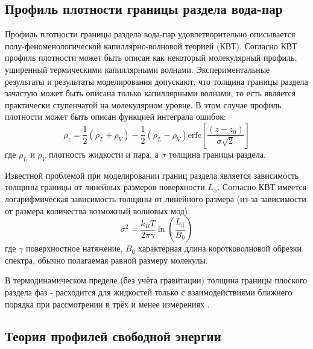 \subsection{Профиль плотности границы раздела вода-пар}

Профиль плотности границы раздела вода-пар удовлетворительно описывается полу-феноменологической капиллярно-волновой теорией (КВТ). Согласно КВТ \cite{cwt_stillinger_1965,rev_benjamin_liq-liq_interf_1997} профиль плотности может быть описан как некоторый молекулярный профиль, уширенный термическими капиллярными волнами. Экспериментальные результаты и результаты моделирования \cite{rev_surf_struct_penfold_2001,cap-simul_senapati_2001, int-wat-polar_rivera_2006} допускают, что толщина границы раздела зачастую может быть описана только капиллярными волнами, то есть является практически ступенчатой на молекулярном уровне. В этом случае профиль плотности может быть описан функцией интеграла ошибок:
\begin{equation}
\rho_z=\frac{1}{2}(\rho_L+\rho_V)-\frac{1}{2}(\rho_L-\rho_V)\mathrm{erfc}\left[\frac{(z-z_0)}{\sigma \sqrt{2}}\right]
\label{erf_prof}
\end{equation}
где $\rho_L$ и $\rho_V$ плотность жидкости и пара, а $\sigma$ толщина границы раздела.

Известной проблемой при моделировании границ раздела является зависимость толщины границы от линейных размеров поверхности $L_x$. Согласно КВТ имеется логарифмическая зависимость толщины от линейного размера (из-за зависимости от размера количества возможный волновых мод):
\begin{equation}
\sigma^2=\frac{k_BT}{2\pi\gamma}\ln{\left(\frac{L_{||}}{B_0}\right)}
\label{cap_wave_dep}
\end{equation}
где $\gamma$ поверхностное натяжение, $B_0$ характерная длина коротковолновой обрезки спектра, обычно полагаемая равной размеру молекулы.

В термодинамическом пределе (без учёта гравитации) толщина границы плоского раздела фаз - расходится для жидкостей только с взаимодействиями ближнего порядка при рассмотрении в трёх и менее измерениях \cite{nointin3d_robert_1985}.

\subsection{\label{pmf_theor_backgr}Теория профилей свободной энергии}

